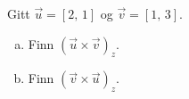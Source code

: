 %
Gitt $\vec{u} = [2,\,1]$ og $\vec{v} = [1,\,3]$.
\begin{enumerate}[a)]
    \item Finn $(\vec{u} \times \vec{v})_z$.
    \item Finn $(\vec{v} \times \vec{u})_z$.
\end{enumerate}
